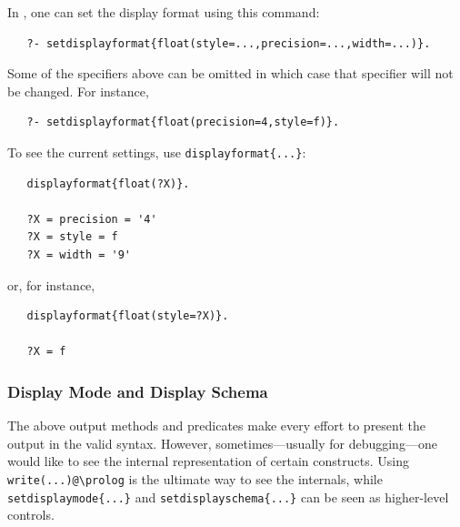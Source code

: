 \documentclass[11pt]{article}
\newcommand{\ERGO}{\mbox{\smaller{\ensuremath{\cal{E}}\smaller{{\sc{RGO}}}}}\xspace}
\newcommand{\FLSYSTEM}{\ERGO}
\newcommand{\bs}{\textbackslash}
\begin{document}
In \FLSYSTEM, one can set the display format using this command:
\begin{verbatim}
   ?- setdisplayformat{float(style=...,precision=...,width=...)}.
\end{verbatim}
Some of the specifiers above can be omitted in which case that specifier
will not be changed. For instance,
\begin{verbatim}
   ?- setdisplayformat{float(precision=4,style=f)}.
\end{verbatim}
To see the current settings, use \texttt{displayformat\{...\}}: 
\begin{verbatim}
   displayformat{float(?X)}.

   ?X = precision = '4'
   ?X = style = f
   ?X = width = '9'
\end{verbatim}
or, for instance,
\begin{verbatim}
   displayformat{float(style=?X)}.

   ?X = f
\end{verbatim}


\subsubsection{Display Mode and  Display Schema}\label{sec-display-mode}

The above output methods and predicates make every effort to present the
output in the valid \FLSYSTEM syntax. However, sometimes---usually for
debugging---one would like to see the internal representation of certain
\FLSYSTEM constructs. Using \texttt{write(...)@\bs{}prolog} is the ultimate
way to see the internals, while \texttt{setdisplaymode\{...\}}
and \texttt{setdisplayschema\{...\}}  
can be seen as higher-level controls.
\end{document}
